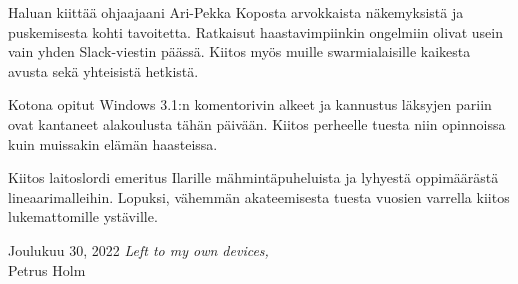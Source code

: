 \documentclass[12pt,a4paper,oneside,pdftex]{report}
\newcommand{\FDATE}{Joulukuu 30, 2022}
\newcommand{\AUTHOR}{Petrus Holm}
\begin{document}
Haluan kiittää ohjaajaani Ari-Pekka Koposta arvokkaista näkemyksistä ja puskemisesta kohti tavoitetta. Ratkaisut haastavimpiinkin ongelmiin olivat usein vain yhden Slack-viestin päässä. Kiitos myös muille swarmialaisille kaikesta avusta sekä yhteisistä hetkistä. 

Kotona opitut Windows 3.1:n komentorivin alkeet ja kannustus läksyjen pariin ovat kantaneet alakoulusta tähän päivään. Kiitos perheelle tuesta niin opinnoissa kuin muissakin elämän haasteissa. 

Kiitos laitoslordi emeritus Ilarille mähmintäpuheluista ja lyhyestä oppimäärästä lineaarimalleihin. Lopuksi, vähemmän akateemisesta tuesta vuosien varrella kiitos lukemattomille ystäville.

\vskip 10mm

\noindent \FDATE
\vskip 5mm
\noindent \textit{Left to my own devices,}\\
\noindent\AUTHOR

\cleardoublepage




\cleardoublepage
\tableofcontents



\label{pages-prelude}
\cleardoublepage
\end{document}
